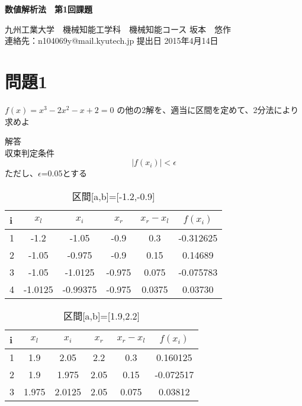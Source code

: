 \documentclass[a4j,twoside,openright,11pt]{jreport}
\begin{document}
\begin{screen}
\huge
\begin{center}
{\bf 数値解析法　第1回課題}\\
\end{center}

\normalsize
\begin{flushright}
九州工業大学　機械知能工学科　機械知能コース  坂本　悠作\\連絡先：n104069y@mail.kyutech.jp \hspace{0.2in}提出日 2015年4月14日
\end{flushright}
\end{screen}

\section{問題1}

$f(x) = x^{3}-2x^{2}-x+2 =0$
の他の2解を、適当に区間を定めて、2分法により求めよ\\
\par
解答\\
収束判定条件\\
\begin{equation}
|f(x_i)|<\epsilon\nonumber
\end{equation}
ただし、$\epsilon$=0.05とする\\
\begin{table}[htb]
\begin{center}
  \caption{区間[a,b]=[-1.2,-0.9]}
  \begin{tabular}{|l||c|c|c|c|c|} \hline
i&$x_l$&$x_i$   &$x_r$ & $x_r-x_l$&$f(x_i)$\\\hline
1&-1.2 &-1.05  &-0.9 & 0.3      &-0.312625\\
2&-1.05&-0.975 &-0.9 & 0.15     &0.14689\\
3&-1.05&-1.0125&-0.975 & 0.075  &-0.075783\\
4&-1.0125&-0.99375&-0.975&0.0375&0.03730\\\hline
  \end{tabular}
\end{center}

\end{table}
\begin{table}[htb]
\begin{center}
  \caption{区間[a,b]=[1.9,2.2]}
  \begin{tabular}{|l||c|c|c|c|c|} \hline
i&$x_l$&$x_i$   &$x_r$ & $x_r-x_l$&$f(x_i)$\\\hline
1&1.9 &2.05  &2.2 & 0.3      &0.160125\\
2&1.9 &1.975 &2.05 & 0.15     &-0.072517\\
3&1.975&2.0125&2.05& 0.075 & 0.03812\\\hline
  \end{tabular}
\end{center}
\end{table}
\end{document}
